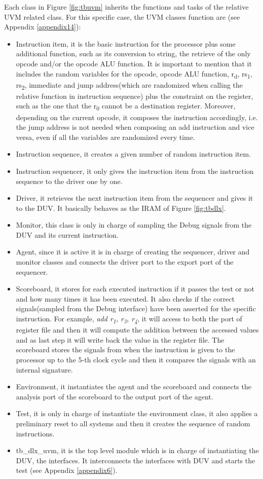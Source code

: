 Each class in Figure \ref{fig:tbuvm} inherits the functions and tasks of the relative UVM related class. For this specific case, the UVM classes function are (see Appendix \ref{appendix14}):
\begin{itemize}
\item Instruction item, it is the basic instruction for the processor plus some additional function, such as its conversion to string, the retrieve of the only opcode and/or the opcode ALU function. It is important to mention that it includes the random variables for the opcode, opcode ALU function, r\textsubscript{d}, rs\textsubscript{1}, rs\textsubscript{2}, immediate and jump address(which are randomized when calling the relative function in instruction sequence) plus the constraint on the register, such as the one that the r\textsubscript{0} cannot be a destination register. Moreover, depending on the current opcode, it composes the instruction accordingly, i.e. the jump address is not needed when composing an add instruction and vice versa, even if all the variables are randomized every time.
\item Instruction sequence, it creates a given number of random instruction item.
\item Instruction sequencer, it only gives the instruction item from the instruction sequence to the driver one by one.
\item Driver, it retrieves the next instruction item from the sequencer and gives it to the DUV. It basically behaves as the IRAM of Figure \ref{fig:tbdlx}.
\item Monitor, this class is only in charge of sampling the Debug signals from the DUV and its current instruction.
\item Agent, since it is active it is in charge of creating the sequencer, driver and monitor classes and connects the driver port to the export port of the sequencer.
\item Scoreboard, it stores for each executed instruction if it passes the test or not and how many times it has been executed. It also checks if the correct signals(sampled from the Debug interface) have been asserted for the specific instruction. For example, \textit{add r\textsubscript{1}, r\textsubscript{3}, r\textsubscript{4}}, it will access to both the port of register file and then it will compute the addition between the accessed values and as last step it will write back the value in the register file. The scoreboard stores the signals from when the instruction is given to the processor up to the 5-th clock cycle and then it compares the signals with an internal signature.
\item Environment, it instantiates the agent and the scoreboard and connects the analysis port of the scoreboard to the output port of the agent.
\item Test, it is only in charge of instantiate the environment class, it also applies a preliminary reset to all systems and then it creates the sequence of random instructions.
\item tb\_dlx\_uvm, it is the top level module which is in charge of instantiating the DUV, the interfaces. It interconnects the interfaces with DUV and starts the test (see Appendix \ref{appendix6}).
\end{itemize}